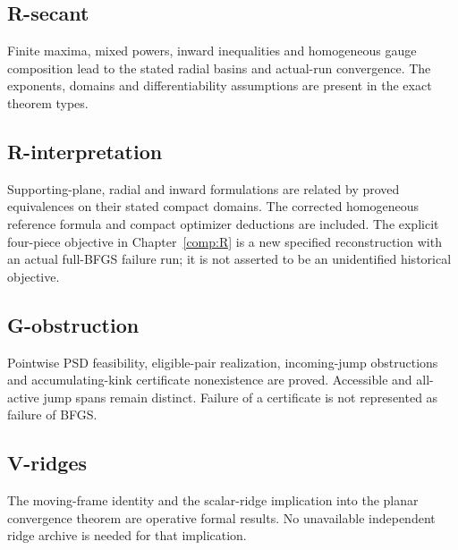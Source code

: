 

\subsection{R-secant}\label{r-secant}

Finite maxima, mixed powers, inward inequalities and homogeneous gauge composition lead to the stated radial basins and actual-run convergence. The exponents, domains and differentiability assumptions are present in the exact theorem types.



\subsection{R-interpretation}\label{r-interpretation}

Supporting-plane, radial and inward formulations are related by proved equivalences on their stated compact domains. The corrected homogeneous reference formula and compact optimizer deductions are included. The explicit four-piece objective in Chapter~\ref{comp:R} is a new specified reconstruction with an actual full-BFGS failure run; it is not asserted to be an unidentified historical objective.



\subsection{G-obstruction}\label{g-obstruction}

Pointwise PSD feasibility, eligible-pair realization, incoming-jump obstructions and accumulating-kink certificate nonexistence are proved. Accessible and all-active jump spans remain distinct. Failure of a certificate is not represented as failure of BFGS.



\subsection{V-ridges}\label{v-ridges}

The moving-frame identity and the scalar-ridge implication into the planar convergence theorem are operative formal results. No unavailable independent ridge archive is needed for that implication.

